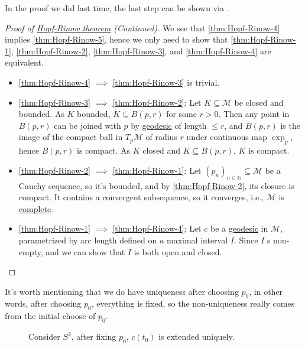 In the proof we did last time, the last step can be shown via \cite[Corollary 3.9]{flaherty2013riemannian}.

\begin{proof}[Proof of \hyperlink{thm:Hopf-Rinow}{Hopf-Rinow theorem} (Continued)]
	We see that \autoref{thm:Hopf-Rinow-4} implies \autoref{thm:Hopf-Rinow-5}, hence we only need to show that \autoref{thm:Hopf-Rinow-1}, \autoref{thm:Hopf-Rinow-2}, \autoref{thm:Hopf-Rinow-3}, and \autoref{thm:Hopf-Rinow-4} are equivalent.
	\begin{itemize}
		\item \autoref{thm:Hopf-Rinow-4} \(\implies \) \autoref{thm:Hopf-Rinow-3} is trivial.
		\item \autoref{thm:Hopf-Rinow-3} \(\implies \) \autoref{thm:Hopf-Rinow-2}: Let \(K \subseteq \mathcal{M} \) be closed and bounded. As \(K\) bounded, \(K \subseteq B(p, r)\) for some \(r > 0\). Then any point in \(B(p, r)\) can be joined with \(p\) by \hyperref[def:geodesic]{geodesic} of length \(\leq r\), and \(B(p, r)\) is the image of the compact ball in \(T_p \mathcal{M} \) of radius \(r\) under continuous map \(\exp _p\), hence \(B(p, r)\) is compact. As \(K\) closed and \(K \subseteq B(p, r)\), \(K\) is compact.
		\item \autoref{thm:Hopf-Rinow-2} \(\implies \) \autoref{thm:Hopf-Rinow-1}: Let \((p_n)_{n \in \mathbb{N} } \subseteq \mathcal{M} \) be a Cauchy sequence, so it's bounded, and by \autoref{thm:Hopf-Rinow-2}, its closure is compact. It contains a convergent subsequence, so it converges, i.e., \(\mathcal{M} \) is \hyperref[def:geodesically-complete]{complete}.
		\item \autoref{thm:Hopf-Rinow-1} \(\implies \) \autoref{thm:Hopf-Rinow-4}: Let \(c\) be a \hyperref[def:geodesic]{geodesic} in \(\mathcal{M} \), parametrized by arc length defined on \(a\) maximal interval \(I\). Since \(I\) s non-empty, and we can show that \(I\) is both open and closed.
	\end{itemize}
\end{proof}

It's worth mentioning that we do have uniqueness after choosing \(p_0\), in other words, after choosing \(p_0\), everything is fixed, so the non-uniqueness really comes from the initial choose of \(p_0\).

\begin{figure}[H]
	\centering
	\caption{Consider \(S^2\), after fixing \(p_0\), \(c(t_0)\) is extended uniquely.}
\end{figure}

